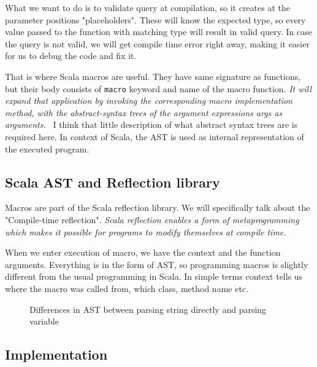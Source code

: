\documentclass[thesis=B,english]{FITthesis}[2019/12/23]
\begin{document}
What we want to do is to validate query at compilation, so it creates at the parameter positions "placeholders". These will know the expected type, so every value passed to the function with matching type will result in valid query. In case the query is not valid, we will get compile time error right away, making it easier for us to debug the code and fix it.

That is where Scala macros are useful. They have same signature as functions, but their body consists of \texttt{macro} keyword and name of the macro function.  \textit{It will expand that application by invoking the corresponding macro implementation method, with the abstract-syntax trees of the argument expressions args as arguments.}~\cite{Def macros} I think that little description of what abstract syntax trees are is required here. In context of Scala, the AST is used as internal representation of the executed program. 

\subsection{Scala AST and Reflection library}
Macros are part of the Scala reflection library. We will specifically talk about the "Compile-time reflection". \textit{Scala reflection enables a form of metaprogramming which makes it possible for programs to modify themselves at compile time.}\cite{Compile-time reflection} 

When we enter execution of macro, we have the context and the function arguments. Everything is in the form of AST, so programming macros is slightly different from the usual programming in Scala. In simple terms context tells us where the macro was called from, which class, method name etc. 

\begin{figure}[h]
  \caption {Differences in AST between parsing string directly and parsing variable}
\end{figure}

\subsection{Implementation}
\end{document}
